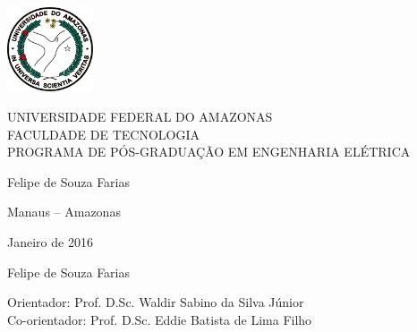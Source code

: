 \begin{center}
\includegraphics[bb=0 0 646 638,height=2.5cm]{ufam.png}

\textsf{\large%
UNIVERSIDADE FEDERAL DO AMAZONAS\\
FACULDADE DE TECNOLOGIA\\
PROGRAMA DE P\'OS-GRADUA\c{C}\~AO EM ENGENHARIA ELÉTRICA}

\vspace*{4cm}
\tittese

\vspace*{4cm}


{\large Felipe de Souza Farias}


\vspace*{3cm}

Manaus -- Amazonas

Janeiro de 2016

\end{center}





\begin{center}
{\large Felipe de Souza Farias}




\vspace*{4cm}
\tittese
\vspace*{2cm}
\descrtese
\vspace*{2cm}


Orientador: Prof. D.Sc. Waldir Sabino da Silva Júnior\\
Co-orientador: Prof. D.Sc. Eddie Batista de Lima Filho\\




\end{center}

